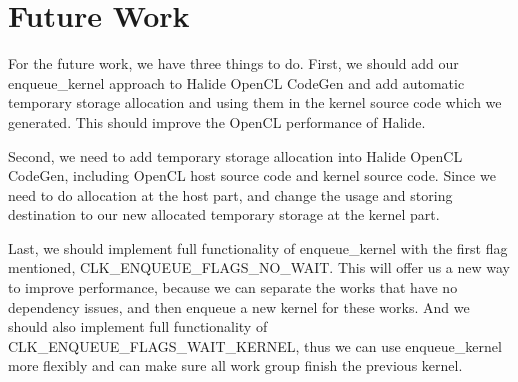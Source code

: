 \chapter{Future Work}
    For the future work, we have three things to do. First, we should add our enqueue\_kernel approach to Halide OpenCL CodeGen and add automatic temporary storage allocation and using them in the kernel source code which we generated. This should improve the OpenCL performance of Halide.

    Second, we need to add temporary storage allocation into Halide OpenCL CodeGen, including OpenCL host source code and kernel source code. Since we need to do allocation at the host part, and change the usage and storing destination to our new allocated temporary storage at the kernel part.

    Last, we should implement full functionality of enqueue\_kernel with the first flag mentioned, CLK\_ENQUEUE\_FLAGS\_NO\_WAIT. This will offer us a new way to improve performance, because we can separate the works that have no dependency issues, and then enqueue a new kernel for these works. And we should also implement full functionality of CLK\_ENQUEUE\_FLAGS\_WAIT\_KERNEL, thus we can use enqueue\_kernel more flexibly and can make sure all work group finish the previous kernel.
